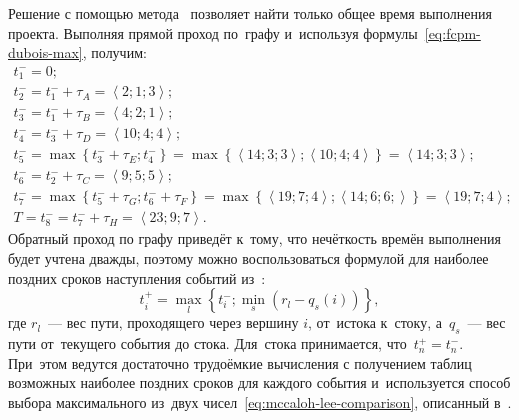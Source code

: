 Решение с помощью метода~\cite{Uskov_FCPM, Dubois_Prade} позволяет найти только общее время выполнения проекта. Выполняя прямой проход по~графу и~используя формулы~\eqref{eq:fcpm-dubois-max}, получим:
\begin{gather*}
  t_1^{-} = 0; \\
  t_2^{-} = t_1^{-}+\tau_A = \left \langle 2;1;3 \right \rangle; \\
  t_3^{-} = t_1^{-}+\tau_B = \left \langle 4;2;1 \right \rangle; \\
  t_4^{-} = t_3^{-}+\tau_D = \left \langle 10;4;4 \right \rangle; \\
  t_5^{-} = \max \left \{ t_3^{-}+\tau_E; t_4^{-} \right \} = \max \left\{ \left \langle 14;3;3 \right \rangle; \left \langle 10;4;4 \right \rangle \right\} = \left \langle 14;3;3 \right \rangle; \\
  t_6^{-} = t_2^{-}+\tau_C = \left \langle 9;5;5 \right \rangle; \\
  t_7^{-} = \max \left \{ t_5^{-}+\tau_G; t_6^{-}+\tau_F \right \} = \max \left\{ \left \langle 19;7;4 \right \rangle; \left \langle 14;6;6; \right \rangle \right\} = \left \langle 19;7;4 \right \rangle; \\
  T = t_8^{-} = t_7^{-} + \tau_H = \left \langle 23;9;7 \right \rangle.
\end{gather*}
Обратный проход по графу приведёт к~тому, что нечёткость времён выполнения будет учтена дважды, поэтому можно воспользоваться формулой для наиболее поздних сроков наступления событий из~\cite{Leondes}:
\begin{equation}
\label{eq:leondes-let-fcpm}
  t_i^{+} = \underset{l}{\max} \left\{ t_i^{-}; \underset{s}{\min} \left(r_l - q_s\left(i \right) \right) \right \},
\end{equation}
где $r_l$~--- вес пути, проходящего через вершину $i$, от~истока к~стоку, а~$q_s$~--- вес пути от~текущего события до стока. Для~стока принимается, что~$t_n^{+}=t_n^{-}$. При~этом ведутся достаточно трудоёмкие вычисления с получением таблиц возможных наиболее поздних сроков для каждого события и~используется способ выбора максимального из~двух чисел~\eqref{eq:mccaloh-lee-comparison}, описанный в~\cite{McCahon_Lee}.

